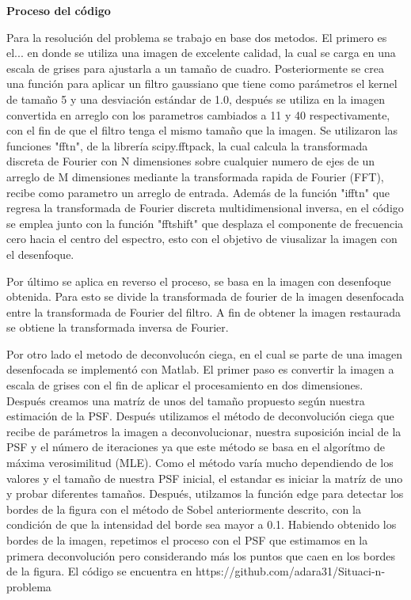 \documentclass[eng]{ajceam-class}
\begin{document}
\textbf {Proceso del código}

Para la resolución del problema se trabajo en base dos metodos. El primero es el... en donde se utiliza una imagen de excelente calidad, la cual se carga en una escala de grises para ajustarla a un tamaño de cuadro. Posteriormente se crea una función para aplicar un filtro gaussiano que tiene como parámetros el kernel de tamaño 5 y una desviación estándar de 1.0, después se utiliza en la imagen convertida en arreglo con los parametros cambiados a 11 y 40 respectivamente, con el fin de que el filtro tenga el mismo tamaño que la imagen. Se utilizaron las funciones "fftn", de la librería scipy.fftpack, la cual calcula la transformada discreta de Fourier con N dimensiones sobre cualquier numero de ejes de un arreglo de M dimensiones mediante la transformada rapida de Fourier (FFT), recibe como parametro un arreglo de entrada. Además de la función "ifftn" que regresa la transformada de Fourier discreta multidimensional inversa, en el código se emplea junto con la función "fftshift" que desplaza el componente de frecuencia cero hacia el centro del espectro, esto con el objetivo de viusalizar la imagen con el desenfoque. 

Por último se aplica en reverso el proceso, se basa en la imagen con desenfoque obtenida. Para esto se divide la transformada de fourier de la imagen desenfocada entre la transformada de Fourier del filtro. A fin de obtener la imagen restaurada se obtiene la transformada inversa de Fourier.

Por otro lado el metodo de deconvolucón ciega, en el cual se parte de una imagen desenfocada se implementó con Matlab. El primer paso es convertir la imagen a escala de grises con el fin de aplicar el procesamiento en dos dimensiones. Después creamos una matríz de unos del tamaño propuesto según nuestra estimación de la PSF. Después utilizamos el método de deconvolución ciega que recibe de parámetros la imagen a deconvolucionar, nuestra suposición incial de la PSF y el número de iteraciones ya que este método se basa en el algorítmo de máxima verosimilitud (MLE). Como el método varía mucho dependiendo de los valores y el tamaño de nuestra PSF inicial, el estandar es iniciar la matríz de uno y probar diferentes tamaños. Después, utilzamos la función edge para detectar los bordes de la figura con  el método de Sobel anteriormente descrito, con la condición de que la intensidad del borde sea mayor a 0.1. Habiendo obtenido los bordes de la imagen, repetimos el proceso con el PSF que estimamos en la primera deconvolución pero considerando más los puntos que caen en los bordes de la figura. El código se encuentra en https://github.com/adara31/Situaci-n-problema
\end{document}
